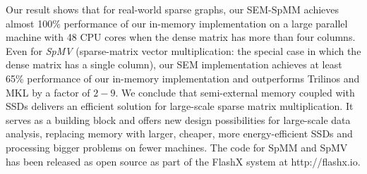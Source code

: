 Our result shows that for real-world sparse graphs, our SEM-SpMM achieves almost
100\% performance of our in-memory implementation on a large parallel machine
with 48 CPU cores when the dense matrix has more than four columns. Even for
{\em SpMV} (sparse-matrix vector multiplication: the special case in which the dense
matrix has a single column), our SEM implementation achieves at least 65\%
performance of our in-memory implementation and outperforms Trilinos \cite{trilinos} and MKL \cite{mkl} by
a factor of $2-9$.
We conclude that semi-external memory coupled with SSDs delivers an efficient
solution for large-scale sparse matrix multiplication. It serves
as a building block and offers new design possibilities for large-scale
data analysis, replacing memory with larger, cheaper, more energy-efficient SSDs
and processing bigger problems on fewer machines. The code for SpMM and SpMV has been
released as open source as part of the FlashX system at http://flashx.io.
